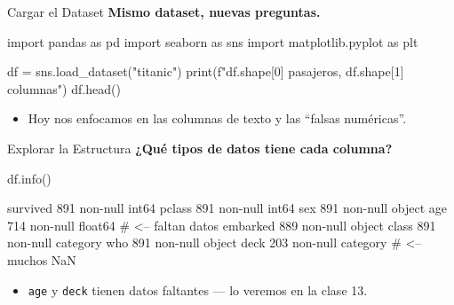 \documentclass[aspectratio=169, 11pt]{beamer}
\begin{document}
\begin{frame}[fragile,shrink=28]{Cargar el Dataset}
  \vspace{-6pt}
  {\footnotesize\color{arcaDark}\bfseries
    Mismo dataset, nuevas preguntas.}

  \vspace{4pt}
  \begin{pyblock}
import pandas as pd
import seaborn as sns
import matplotlib.pyplot as plt

df = sns.load_dataset("titanic")
print(f"{df.shape[0]} pasajeros, {df.shape[1]} columnas")
df.head()
  \end{pyblock}

  \vspace{4pt}
  {\scriptsize\color{textMuted}
  \begin{itemize}\setlength{\itemsep}{3pt}
    \item[{\color{arcaRed}\scriptsize\faArrowRight}] Hoy nos enfocamos en las columnas de texto y las ``falsas numéricas''.
  \end{itemize}
  }
\end{frame}

\begin{frame}[fragile,shrink=28]{Explorar la Estructura}
  \vspace{-6pt}
  {\footnotesize\color{arcaDark}\bfseries
    ¿Qué tipos de datos tiene cada columna?}

  \vspace{4pt}
  \begin{pyblock}
df.info()
  \end{pyblock}

  \vspace{4pt}
  \begin{outputblock}
survived      891 non-null    int64
pclass        891 non-null    int64
sex           891 non-null    object
age           714 non-null    float64   # <-- faltan datos
embarked      889 non-null    object
class         891 non-null    category
who           891 non-null    object
deck          203 non-null    category  # <-- muchos NaN
  \end{outputblock}

  \vspace{4pt}
  {\scriptsize\color{textMuted}
  \begin{itemize}\setlength{\itemsep}{3pt}
    \item[{\color{codeOrange}\scriptsize\faExclamationTriangle}]
      \texttt{age} y \texttt{deck} tienen datos faltantes --- lo veremos en la clase 13.
  \end{itemize}
  }
\end{frame}
\end{document}
